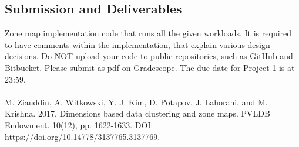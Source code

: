 \documentclass[12pt,a4paper,twoside]{article}
\newcommand{\assignmenttype}{Project}       %
\newcommand{\assignmentnumber}{1}           %
\begin{document}
\subsection*{Submission and Deliverables}
Zone map implementation code that runs all the given workloads. 
It is required to have comments within the implementation, that explain various design decisions. 
Do NOT upload your code to public repositories, such as GitHub and Bitbucket. 
Please submit as pdf on Gradescope. 
The due date for \assignmenttype{} \assignmentnumber{} is  at 23:59. \\\\

\noindent [1] M. Ziauddin, A. Witkowski, Y. J. Kim, D. Potapov, J. Lahorani, and M. Krishna. 2017. Dimensions based data clustering and zone maps. PVLDB Endowment. 10(12), pp. 1622-1633. DOI: https://doi.org/10.14778/3137765.3137769. 
\end{document}
